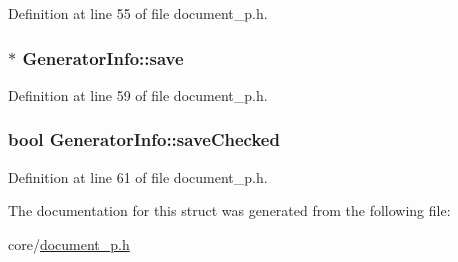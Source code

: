 Definition at line 55 of file document\+\_\+p.\+h.

\hypertarget{structGeneratorInfo_a9c449e96a994af33db9fb1ef723b15e2}{
\subsubsection[{save}]{$\ast$ Generator\+Info\+::save}}\label{structGeneratorInfo_a9c449e96a994af33db9fb1ef723b15e2}


Definition at line 59 of file document\+\_\+p.\+h.

\hypertarget{structGeneratorInfo_a01a979aa72570fde20d2efd8a442a7bc}{
\subsubsection[{save\+Checked}]{\setlength{\rightskip}{0pt plus 5cm}bool Generator\+Info\+::save\+Checked}}\label{structGeneratorInfo_a01a979aa72570fde20d2efd8a442a7bc}


Definition at line 61 of file document\+\_\+p.\+h.



The documentation for this struct was generated from the following file\+:\begin{DoxyCompactItemize}
\item 
core/\hyperlink{document__p_8h}{document\+\_\+p.\+h}\end{DoxyCompactItemize}
